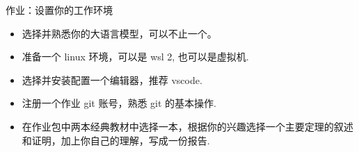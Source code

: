 \documentclass{beamer}
\begin{document}


\begin{frame}{作业：设置你的工作环境}
  \begin{itemize}
  \item<1-> 选择并熟悉你的大语言模型，可以不止一个。
  \item<2-> 准备一个 linux 环境，可以是 wsl 2, 也可以是虚拟机.
  \item<3-> 选择并安装配置一个编辑器，推荐 vscode. 
  \item<4-> 注册一个作业 git 账号，熟悉 git 的基本操作.
  \item<5-> 在作业包中两本经典教材中选择一本，根据你的兴趣选择一个主要定理的叙述和证明，加上你自己的理解，写成一份报告.
  \end{itemize}
\end{frame}



\end{document}
